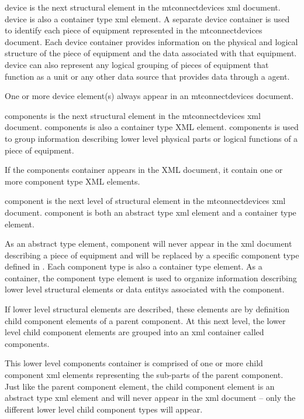 \gls{device} is the next \gls{structural element} in the \gls{mtconnectdevices} \gls{xml} document. \gls{device} is also a container type \gls{xml} element. A separate \gls{device} container is used to identify each piece of equipment represented in the \gls{mtconnectdevices} document. Each \gls{device} container provides information on the physical and logical structure of the piece of equipment and the data associated with that equipment. \gls{device} can also represent any logical grouping of pieces of equipment that function as a unit or any other data source that provides data through a \gls{agent}.

One or more \gls{device} element(s) \MUST always appear in an \gls{mtconnectdevices} document.

\gls{components} is the next \gls{structural element} in the \gls{mtconnectdevices} \gls{xml} document. \gls{components} is also a container type XML element. \gls{components} is used to group information describing \gls{lower level} physical parts or logical functions of a piece of equipment.

If the \gls{components} container appears in the XML document, it \MUST contain one or more \gls{component} type XML elements.

\gls{component} is the next level of \gls{structural element} in the \gls{mtconnectdevices} \gls{xml} document. \gls{component} is both an abstract type \gls{xml} element and a container type element. 

As an abstract type element, \gls{component} will never appear in the \gls{xml} document describing a piece of equipment and will be replaced by a specific \gls{component} type defined in . Each \gls{component} type is also a container type element. As a container, the \gls{component} type element is used to organize information describing \gls{lower level} \glspl{structural element} or \glspl{data entity} associated with the \gls{component}.

If \gls{lower level} \glspl{structural element} are described, these elements are by definition child \gls{component} elements of a parent \gls{component}. At this next level, the \gls{lower level} child \gls{component} elements are grouped into an \gls{xml} container called \gls{components}.
 
This \gls{lower level} \gls{components} container is comprised of one or more child \gls{component} \gls{xml} elements representing the sub-parts of the parent \gls{component}. Just like the parent \gls{component} element, the child \gls{component} element is an abstract type \gls{xml} element and will never appear in the \gls{xml} document – only the different \gls{lower level} child \gls{component} types will appear.

